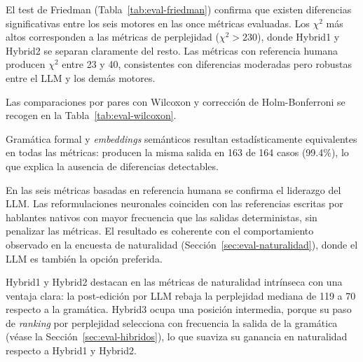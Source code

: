 El test de Friedman (Tabla~\ref{tab:eval-friedman}) confirma que existen diferencias significativas entre los seis motores en las once métricas evaluadas. Los $\chi^2$ más altos corresponden a las métricas de perplejidad ($\chi^2 > 230$), donde Hybrid1 y Hybrid2 se separan claramente del resto. Las métricas con referencia humana producen $\chi^2$ entre 23 y 40, consistentes con diferencias moderadas pero robustas entre el LLM y los demás motores.

Las comparaciones por pares con Wilcoxon y corrección de Holm-Bonferroni se recogen en la Tabla~\ref{tab:eval-wilcoxon}.

\begin{table}[ht]
\centering
{}
\caption{Hallazgos principales del test de Wilcoxon por pares con corrección de Holm-Bonferroni. El símbolo $\equiv$ indica ausencia de diferencia significativa; $>$ indica superioridad significativa.}
\label{tab:eval-wilcoxon}
\end{table}

Gramática formal y \textit{embeddings} semánticos resultan estadísticamente equivalentes en todas las métricas: producen la misma salida en 163 de 164 casos (99.4\%), lo que explica la ausencia de diferencias detectables.

En las seis métricas basadas en referencia humana se confirma el liderazgo del LLM. Las reformulaciones neuronales coinciden con las referencias escritas por hablantes nativos con mayor frecuencia que las salidas deterministas, sin penalizar las métricas. El resultado es coherente con el comportamiento observado en la encuesta de naturalidad (Sección~\ref{sec:eval-naturalidad}), donde el LLM es también la opción preferida.

Hybrid1 y Hybrid2 destacan en las métricas de naturalidad intrínseca con una ventaja clara: la post-edición por LLM rebaja la perplejidad mediana de 119 a 70 respecto a la gramática. Hybrid3 ocupa una posición intermedia, porque su paso de \textit{ranking} por perplejidad selecciona con frecuencia la salida de la gramática (véase la Sección~\ref{sec:eval-hibridos}), lo que suaviza su ganancia en naturalidad respecto a Hybrid1 y Hybrid2.

